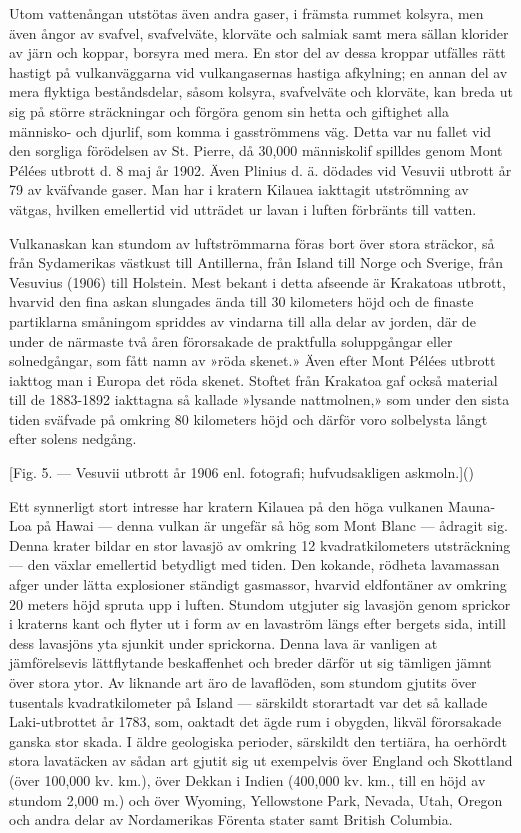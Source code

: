 \documentclass[a4paper, 12pt, oneside, swedish]{article}
\begin{document}
Utom vattenångan utstötas även andra gaser, i främsta rummet kolsyra, men även ångor av svafvel, svafvelväte, klorväte och salmiak samt mera sällan klorider av järn och koppar, borsyra med mera. En stor del av dessa kroppar utfälles rätt hastigt på vulkanväggarna vid vulkangasernas hastiga afkylning; en annan del av mera flyktiga beståndsdelar, såsom kolsyra, svafvelväte och klorväte, kan breda ut sig på större sträckningar och förgöra genom sin hetta och giftighet alla människo- och djurlif, som komma i gasströmmens väg. Detta var nu fallet vid den sorgliga förödelsen av St. Pierre, då 30,000 människolif spilldes genom Mont Pélées utbrott d. 8 maj år 1902. Även Plinius d. ä. dödades vid Vesuvii utbrott år 79 av kväfvande gaser. Man har i kratern Kilauea iakttagit utströmning av vätgas, hvilken emellertid vid utträdet ur lavan i luften förbränts till vatten.

Vulkanaskan kan stundom av luftströmmarna föras bort över stora sträckor, så från Sydamerikas västkust till Antillerna, från Island till Norge och Sverige, från Vesuvius (1906) till Holstein. Mest bekant i detta afseende är Krakatoas utbrott, hvarvid den fina askan slungades ända till 30 kilometers höjd och de finaste partiklarna småningom spriddes av vindarna till alla delar av jorden, där de under de närmaste två åren förorsakade de praktfulla soluppgångar eller solnedgångar, som fått namn av »röda skenet.» Även efter Mont Pélées utbrott iakttog man i Europa det röda skenet. Stoftet från Krakatoa gaf också material till de 1883-1892 iakttagna så kallade »lysande nattmolnen,» som under den sista tiden sväfvade på omkring 80 kilometers höjd och därför voro solbelysta långt efter solens nedgång.

[Fig. 5. --- Vesuvii utbrott år 1906 enl. fotografi; hufvudsakligen askmoln.]()

Ett synnerligt stort intresse har kratern Kilauea på den höga vulkanen Mauna-Loa på Hawai --- denna vulkan är ungefär så hög som Mont Blanc --- ådragit sig. Denna krater bildar en stor lavasjö av omkring 12 kvadratkilometers utsträckning --- den växlar emellertid betydligt med tiden. Den kokande, rödheta lavamassan afger under lätta explosioner ständigt gasmassor, hvarvid eldfontäner av omkring 20 meters höjd spruta upp i luften. Stundom utgjuter sig lavasjön genom sprickor i kraterns kant och flyter ut i form av en lavaström längs efter bergets sida, intill dess lavasjöns yta sjunkit under sprickorna. Denna lava är vanligen at jämförelsevis lättflytande beskaffenhet och breder därför ut sig tämligen jämnt över stora ytor. Av liknande art äro de lavaflöden, som stundom gjutits över tusentals kvadratkilometer på Island --- särskildt storartadt var det så kallade Laki-utbrottet år 1783, som, oaktadt det ägde rum i obygden, likväl förorsakade ganska stor skada. I äldre geologiska perioder, särskildt den tertiära, ha oerhördt stora lavatäcken av sådan art gjutit sig ut exempelvis över England och Skottland (över 100,000 kv. km.), över Dekkan i Indien (400,000 kv. km., till en höjd av stundom 2,000 m.) och över Wyoming, Yellowstone Park, Nevada, Utah, Oregon och andra delar av Nordamerikas Förenta stater samt British Columbia.
\end{document}
